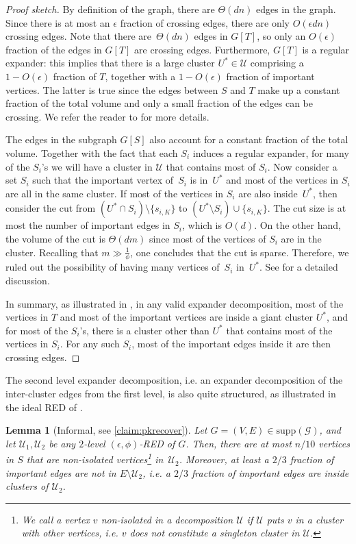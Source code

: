 \documentclass[epsfig,letter,11pt]{article}
\numberwithin{equation}{section}
\newcommand{\eps}{\epsilon}
\newcommand*{\supp}{\mathrm{supp}}
\newtheorem{lemma}[theorem]{Lemma}
\begin{document}
\begin{proof} [Proof sketch]
    By definition of the graph, there are $\Theta(dn)$ edges in the graph. Since there is at most an $\eps$ fraction of crossing edges, there are only $O(\eps dn)$ crossing edges. Note that there are~$\Theta(dn)$ edges in $G[T]$, so only an $O(\eps)$ fraction of the edges in $G[T]$ are crossing edges. Furthermore, $G[T]$ is a regular expander: this implies that there is a large cluster $U^* \in \mathcal{U}$ comprising a $1-O(\eps)$ fraction of $T$, together with a $1-O(\eps)$ fraction of important vertices. The latter is true since the edges between $S$ and $T$ make up a constant fraction of the total volume and only a small fraction of the edges can be crossing. We refer the reader to  for more details. 
    

    The edges in the subgraph $G[S]$ also account for a constant fraction of the total volume. Together with the fact that each $S_i$ induces a regular expander, for many of the $S_i$'s we will have a cluster in $\mathcal{U}$ that contains most of $S_i$. Now consider a set $S_i$ such that the important vertex of~$S_i$ is in~$U^*$ and most of the vertices in $S_i$ are all in the same cluster. If most of the vertices in $S_i$ are also inside~$U^*$, then consider the cut from $(U^* \cap S_i )\setminus\{s_{i,K}\} $ to $(U^* \setminus S_i) \cup \{s_{i,K}\}$. The cut size is at most the number of important edges in $S_i$, which is $O(d)$. On the other hand, the volume of the cut is $\Theta(dm)$ since most of the vertices of $S_i$ are in the cluster. Recalling that $m \gg \frac{1}{\phi}$, one concludes that the cut is sparse. Therefore, we ruled out the possibility of having many vertices of~$S_i$ in~$U^*$. See  for a detailed discussion. 
    
    In summary, as illustrated in , in any valid expander decomposition, most of the vertices in $T$ and most of the important vertices are inside a giant cluster $U^*$, and for most of the $S_i$'s, there is a cluster other than $U^*$ that contains most of the vertices in $S_i$. For any such $S_i$, most of the important edges inside it are then crossing edges.
\end{proof}
\noindent
The second level expander decomposition, i.e. an expander decomposition of the inter-cluster edges from the first level, is also quite structured, as illustrated in the ideal RED of . 

\begin{lemma}[Informal, see \cref{claim:pkrecover}] \label{lem:sec-round-ov}
    Let $G=(V,E) \in \supp(\mathcal{G})$, and let $\mathcal{U}_1,\mathcal{U}_2$ be any $2$-level $(\epsilon,\phi)$-RED  of $G$. Then, there are at most $n/10$ vertices in $S$ that are non-isolated vertices\footnote{We call a vertex $v$ non-isolated in a decomposition $\mathcal{U}$ if $\mathcal{U}$ puts $v$ in a cluster with other vertices, i.e. $v$ does not constitute a singleton cluster in $\mathcal{U}$.} in~$\mathcal{U}_2$. Moreover, at least a $2/3$ fraction of important edges are not in $E\setminus \mathcal{U}_2$, i.e. a $2/3$ fraction of important edges are inside clusters of $ \mathcal{U}_2$.
\end{lemma}
\end{document}
